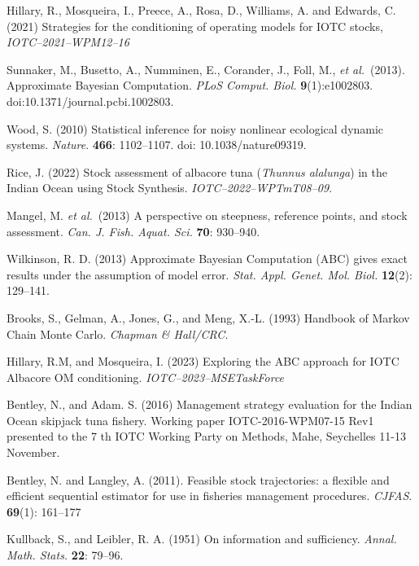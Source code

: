 \documentclass[11pt]{article}
\newcommand{\etal}{\textit{et al.}}
\begin{document}
\clearpage
\begin{thebibliography}{99}
       
     Hillary, R., Mosqueira, I., Preece, A., Rosa, D., Williams, A. and Edwards, C. (2021) Strategies for the conditioning of operating models for IOTC stocks, \textit{IOTC--2021--WPM12--16}
    
     Sunnaker, M., Busetto, A., Numminen, E., Corander, J., Foll, M., \etal~(2013). Approximate Bayesian Computation. \textit{PLoS Comput. Biol.} {\bf 9}(1):e1002803. doi:10.1371/journal.pcbi.1002803.
         
     Wood, S. (2010) Statistical inference for noisy nonlinear ecological dynamic systems. \textit{Nature}. {\bf 466}: 1102--1107. doi: 10.1038/nature09319.

     Rice, J. (2022) Stock assessment of albacore tuna (\textit{Thunnus alalunga}) in the Indian Ocean using Stock Synthesis. \textit{IOTC--2022--WPTmT08--09}.

     Mangel, M. \etal~(2013) A perspective on steepness, reference points, and stock assessment. \textit{Can. J. Fish. Aquat. Sci.} {\bf 70}: 930--940.

     Wilkinson, R. D. (2013) Approximate Bayesian Computation (ABC) gives exact results under the assumption of model error. \textit{Stat. Appl. Genet. Mol. Biol.} {\bf 12}(2): 129--141.
    
     Brooks, S., Gelman, A., Jones, G., and Meng, X.-L. (1993) Handbook of Markov Chain Monte Carlo. \textit{Chapman \& Hall/CRC}.

     Hillary, R.M, and Mosqueira, I. (2023) Exploring the ABC approach for IOTC Albacore
        OM conditioning. \textit{IOTC--2023--MSETaskForce}
    
     Bentley, N., and Adam. S. (2016) Management strategy evaluation for the Indian Ocean skipjack tuna fishery. Working paper IOTC-2016-WPM07-15 Rev1 presented to the 7 th IOTC Working Party on Methods, Mahe, Seychelles 11-13 November.
    
     Bentley, N. and Langley, A. (2011). Feasible stock trajectories: a flexible and efficient sequential estimator for use in fisheries management procedures. \textit{CJFAS}. {\bf 69}(1): 161--177  

     Kullback, S., and Leibler, R. A. (1951) On information and sufficiency. \textit{Annal. Math. Stats.} {\bf 22}: 79--96.

\end{thebibliography}
\end{document}
